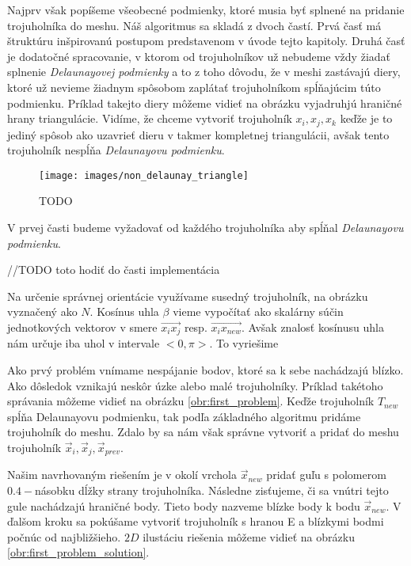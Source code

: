 Najprv však popíšeme všeobecné podmienky, ktoré musia byť splnené na pridanie trojuholníka do meshu.
Náš algoritmus sa skladá z dvoch častí. Prvá časť má štruktúru inšpirovanú postupom predstavenom v 
úvode tejto kapitoly. Druhá časť je dodatočné spracovanie, v ktorom od trojuholníkov už nebudeme vždy 
žiadať splnenie \textit{Delaunayovej podmienky} a to z toho dôvodu, že v meshi zastávajú diery, 
ktoré už nevieme žiadnym spôsobom zaplátať trojuholníkom spĺňajúcim túto podmienku.
Príklad takejto diery môžeme vidieť na obrázku %
vyjadruhjú hraničné hrany triangulácie. Vidíme, že chceme vytvoriť trojuholník $x_i, x_j, x_k$
keďže je to jediný spôsob ako uzavrieť dieru v takmer kompletnej triangulácii,
avšak tento trojuholník nespĺňa \textit{Delaunayovu podmienku}.


\begin{figure}
    \centerline{\texttt{[image: images/non\_delaunay\_triangle]}}
    \caption[]{TODO}
    \label{obr:non_delaunay_triangle}
\end{figure}


V prvej časti budeme vyžadovať od každého trojuholníka aby
spĺňal \textit{Delaunayovu podmienku}. 




    
    //TODO toto hodiť do časti implementácia
    
    Na určenie správnej orientácie využívame susedný trojuholník, na obrázku vyznačený 
    ako $N$. Kosínus uhla $\beta$ vieme vypočítať ako skalárny súčin jednotkových vektorov 
    v smere $\overrightarrow{x_i x_j}$ resp. $\overrightarrow{x_i x_{new}}$. 
    Avšak znalosť kosínusu uhla nám určuje iba uhol v intervale $<0, \pi>$. To vyriešime 


Ako prvý problém vnímame nespájanie bodov, ktoré sa k sebe nachádzajú blízko. Ako dôsledok vznikajú neskôr
úzke alebo malé trojuholníky. Príklad takétoho správania môžeme vidieť na obrázku \ref{obr:first_problem}.
Keďže trojuholník $T_{new}$ spĺňa Delaunayovu podmienku, tak podľa základného algoritmu pridáme trojuholník
do meshu. Zdalo by sa nám však správne vytvoriť a pridať do meshu trojuholník 
$\overrightarrow{x}_i, \overrightarrow{x}_j, \overrightarrow{x}_{prev}$. 

Našim navrhovaným riešením je v okolí vrchola $\overrightarrow{x}_{new}$ pridať guľu s polomerom $0.4-$násobku 
dĺžky strany trojuholníka. Následne zisťujeme, či sa vnútri tejto gule nachádzajú hraničné body. 
Tieto body nazveme blízke body k bodu $\overrightarrow{x}_{new}$. V ďalšom kroku sa pokúšame vytvoriť trojuholník s
hranou E a blízkymi bodmi počnúc od najbližšieho. $2D$ ilustáciu riešenia môžeme vidieť na obrázku 
\ref{obr:first_problem_solution}. 

